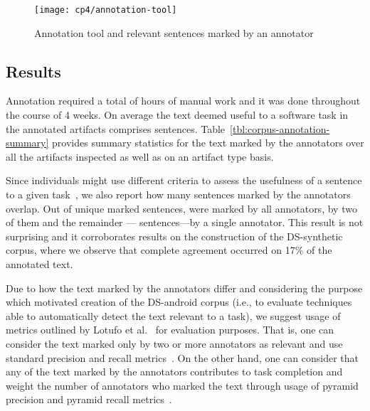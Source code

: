 \begin{figure}
    \centering
    \texttt{[image: cp4/annotation-tool]}
    \caption{Annotation tool and relevant sentences marked by an annotator}
    \label{fig:corpus-annotation-tool}
\end{figure}




\subsection{Results}


Annotation required a total of  hours of manual work and it was done throughout the course of 4 weeks.
On average the text deemed useful to a software task in the annotated artifacts comprises 
 sentences. 
Table~\ref{tbl:corpus-annotation-summary} provides summary statistics for the text marked by 
the annotators over all the artifacts inspected as well as on an artifact type basis.











Since individuals might use different criteria to
assess the usefulness of a sentence to a given task~\cite{Barry1994, Barry1998, Freund2015},
we also report how many sentences marked by the annotators overlap.
Out of 
unique marked
sentences, 
 were marked by all annotators,
 by two of them and the remainder
--- sentences---by a single annotator.
This result is not surprising and it corroborates 
results on the construction of the \acs{DS-synthetic} 
corpus, where we observe that complete agreement 
occurred on 17\% of the annotated text.




Due to how the text marked by the annotators differ
and considering the purpose which motivated creation of the \acs{DS-android} corpus
(i.e., to evaluate techniques able to automatically detect the text relevant to a task),
we suggest usage of  metrics outlined by Lotufo et al.~\cite{Lotufo2012} for evaluation purposes. 
That is,
one can consider the text marked only by two or more annotators as relevant
and use standard precision and recall metrics~\cite{Manning2009IR}. 
On the other hand, one can consider that
any of the text marked by the annotators 
contributes to task completion and weight the number of 
annotators who marked the text through usage of pyramid 
precision and pyramid recall metrics~\cite{Nenkova2004, Lotufo2012}. 









